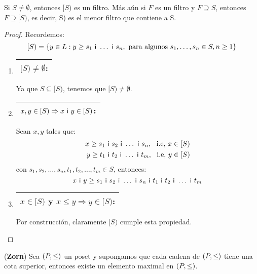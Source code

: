   \begin{lemma} \label{lemma_22}
    \PN Si $S \neq \emptyset$, entonces $[S)$ es un filtro. Más aún si $F$ es un filtro y $F \supseteq S$, entonces $F
    \supseteq \lbrack S)$, es decir, \lbrack S) es el menor filtro que contiene a S.
  \end{lemma}
  \begin{proof}
    \PN Recordemos:
    \[
      [S) = \{y \in L: y \geq s_{1} \ \mathsf{i} \ \dotsc \ \mathsf{i} \ s_{n}, \text{ para algunos } s_{1}, \dotsc, s_{n} \in S,
      n \geq 1\}
    \]

    \begin{enumerate}
      \item \begin{tabular}{|c|} \hline $[S) \neq \emptyset$: \\\hline \end{tabular} Ya que $S \subseteq \lbrack S)$,
        tenemos que $[S) \neq \emptyset$.
      \item \begin{tabular}{|c|} \hline $x, y \in [S) \Rightarrow x \ \mathsf{i} \ y \in [S)$: \\\hline \end{tabular} Sean $x,
        y$ tales que:
        \begin{eqnarray*}
          x \geq s_{1} \ \IN \ s_{2} \ \IN \ \dotsc \ \IN \ s_{n}, \ \text{ i.e, } x \in [S) \\
          y \geq t_{1} \ \IN \ t_{2} \ \IN \ \dotsc \ \IN \ t_{m}, \ \text{ i.e, } y \in [S)
        \end{eqnarray*}
        \PN con $s_{1}, s_{2}, \dotsc, s_{n}, t_{1}, t_{2}, \dotsc, t_{m} \in S$, entonces:
        \[
          x \ \IN \ y \geq s_{1} \ \IN \ s_{2} \ \IN \ \dotsc \ \IN \  s_{n} \ \IN \ t_{1} \ \IN \ t_{2} \ \IN \ \dotsc
          \ \IN \ t_{m}
        \]
      \item \begin{tabular}{|c|} \hline $x \in [S)$ y $x \leq y \Rightarrow y \in [S)$: \\\hline \end{tabular} Por
        construcción, claramente $[S)$ cumple esta propiedad.
    \end{enumerate}
  \end{proof}

  \begin{lemma} \label{lemma_23}
    \PN (\textbf{Zorn}) Sea $(P, \leq)$ un poset y supongamos que cada cadena de $(P, \leq)$ tiene una cota superior, entonces
    existe un elemento maximal en $(P, \leq)$.
  \end{lemma}

